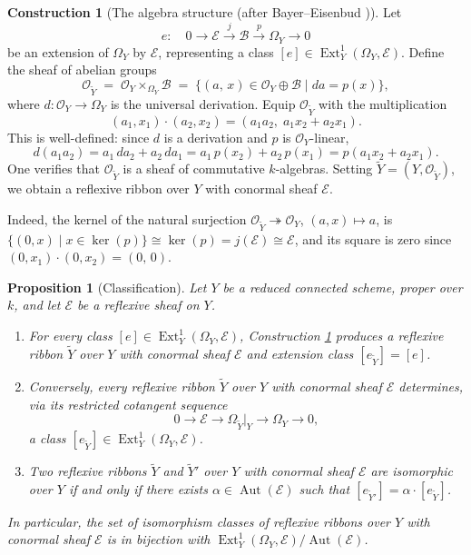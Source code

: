 \documentclass[11pt,twoside]{amsart}
\theoremstyle{plain}
\numberwithin{equation}{section}
\newtheorem{proposition}[theorem]{Proposition}
\theoremstyle{definition}
\newtheorem{construction}[definition]{Construction}
\newcommand{\cO}{\mathscr{O}}
\newcommand{\cE}{\mathscr{E}}
\newcommand{\cB}{\mathscr{B}}
\newcommand{\cI}{\mathscr{I}}
\newcommand{\Yt}{\widetilde{Y}}
\newcommand{\Ext}{\operatorname{Ext}}
\newcommand{\Aut}{\operatorname{Aut}}
\begin{document}
\begin{construction}[The algebra structure
{\normalfont (after Bayer--Eisenbud \cite[Theorem~1.2]{BE95})}]
\label{con:algebra}
Let
\[
e \colon \quad 0 \longrightarrow \cE
  \overset{j}{\longrightarrow} \cB
  \overset{p}{\longrightarrow} \Omega_Y \longrightarrow 0
\]
be an extension of $\Omega_Y$ by $\cE$, representing a class
$[e] \in \Ext^{1}_{Y}(\Omega_Y, \cE)$.
Define the sheaf of abelian groups
\[
\cO_{\Yt} \;=\; \cO_Y \times_{\Omega_Y} \cB
\;=\; \bigl\{(a,\, x) \in \cO_Y \oplus \cB
  \;\big|\; da = p(x)\bigr\},
\]
where $d \colon \cO_Y \to \Omega_Y$ is the universal derivation. Equip
$\cO_{\Yt}$ with the multiplication
\[
(a_1, x_1)\cdot (a_2, x_2) = (a_1 a_2,\; a_1 x_2 + a_2 x_1).
\]
This is well-defined: since $d$ is a derivation and $p$ is
$\cO_Y$-linear,
\[
d(a_1 a_2) = a_1\, da_2 + a_2\, da_1
  = a_1\, p(x_2) + a_2\, p(x_1) = p(a_1 x_2 + a_2 x_1).
\]
One verifies that $\cO_{\Yt}$ is a sheaf of commutative $k$-algebras.
Setting $\Yt = (Y, \cO_{\Yt})$, we obtain a reflexive ribbon over $Y$
with conormal sheaf $\cE$.
 
Indeed, the kernel of the natural surjection $\cO_{\Yt} \twoheadrightarrow \cO_Y$, $(a,x)\mapsto a$, is
$\{(0, x) \mid x \in \ker(p)\} \cong \ker(p) = j(\cE) \cong \cE$,
and its square is zero since
$(0,x_1)\cdot(0,x_2) = (0,\, 0)$.
 
\end{construction}
 
\begin{proposition}[Classification]\label{prop:classification}
Let $Y$ be a reduced connected scheme, proper over $k$, and let
$\cE$ be a reflexive sheaf on $Y$.
\begin{enumerate}
  \item[\textup{(1)}] For every class
    $[e] \in \Ext^{1}_{Y}(\Omega_Y, \cE)$, Construction
    \ref{con:algebra} produces a reflexive ribbon $\Yt$ over $Y$ with
    conormal sheaf $\cE$ and extension class $[e_{\Yt}] = [e]$.
  \item[\textup{(2)}] Conversely, every reflexive ribbon $\Yt$ over
    $Y$ with conormal sheaf $\cE$ determines, via its restricted
    cotangent sequence
    \[
    0 \longrightarrow \cE \longrightarrow \Omega_{\Yt}\big|_{Y}
      \longrightarrow \Omega_Y \longrightarrow 0,
    \]
    a class $[e_{\Yt}] \in \Ext^{1}_{Y}(\Omega_Y, \cE)$.
  \item[\textup{(3)}] Two reflexive ribbons $\Yt$ and $\Yt'$ over
    $Y$ with conormal sheaf $\cE$ are isomorphic over $Y$ if and only
    if there exists $\alpha \in \Aut(\cE)$ such that
    $[e_{\Yt'}] = \alpha \cdot [e_{\Yt}]$.
\end{enumerate}
In particular, the set of isomorphism classes of reflexive ribbons
over $Y$ with conormal sheaf $\cE$ is in bijection with
$\Ext^{1}_{Y}(\Omega_Y, \cE) / \Aut(\cE)$.
\end{proposition}
 
\end{document}
